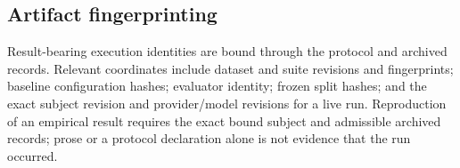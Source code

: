 \subsection{Artifact fingerprinting}
Result-bearing execution identities are bound through the protocol and archived
records. Relevant coordinates include dataset and suite revisions and
fingerprints; baseline configuration hashes; evaluator identity; frozen split
hashes; and the exact subject revision and provider/model revisions for a live
run. Reproduction of an empirical result requires the exact bound subject and
admissible archived records; prose or a protocol declaration alone is not
evidence that the run occurred.
